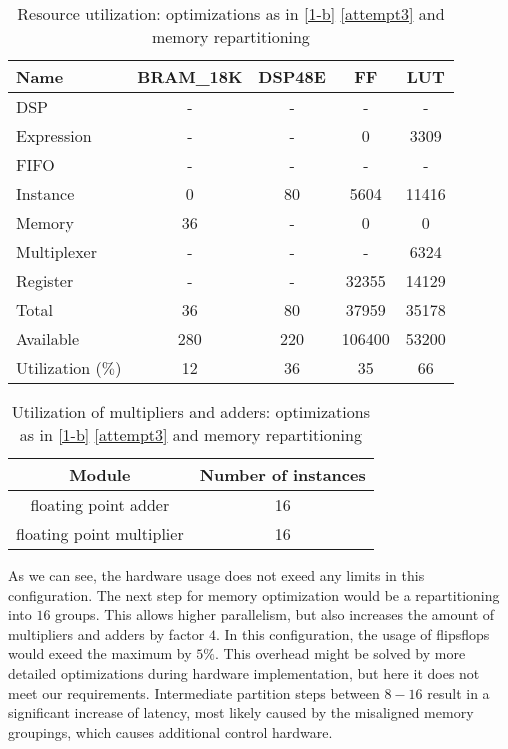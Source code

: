 \documentclass[../main.tex]{subfiles}
\begin{document}
	\begin{table}[H]
		\centering
		\begin{tabular}{lcccc}
			Name      & BRAM\_18K& DSP48E&   FF   &  LUT  \\
			\hline
			DSP              &        -&      -&       -&      -\\
			Expression       &        -&      -&       0&   3309\\
			FIFO             &        -&      -&       -&      -\\
			Instance         &        0&     80&    5604&  11416\\
			Memory           &       36&      -&       0&      0\\
			Multiplexer      &        -&      -&       -&   6324\\
			Register         &        -&      -&   32355&  14129\\
			\hline
			Total            &       36&     80&   37959&  35178\\
			Available        &      280&    220&  106400&  53200\\
			\hline
			Utilization ($\%$)  &       12&     36&      35&     66
		\end{tabular}
		\caption{Resource utilization: optimizations as in \ref{1-b} \ref{attempt3} and memory repartitioning}
		\label{1-c-resources}
	\end{table}

	\begin{table}[H]
		\centering
		\begin{tabular}{cc}
			Module & Number of instances \\
			\hline
			floating point adder & 16 \\
			floating point multiplier & 16
		\end{tabular}
		\caption{Utilization of multipliers and adders: optimizations as in \ref{1-b} \ref{attempt3} and memory repartitioning}
		\label{1-c-resources-arithmetic}
	\end{table}

	As we can see, the hardware usage does not exeed any limits in this configuration. The next step for memory optimization would be a repartitioning into $16$ groups.
	This allows higher parallelism, but also increases the amount of multipliers and adders by factor $4$. In this configuration, the usage of flipsflops would exeed the maximum by $5\%$. This overhead might be solved by more detailed optimizations during hardware implementation, but here it does not meet our requirements.
	Intermediate partition steps between $8-16$ result in a significant increase of latency, most likely caused by the misaligned memory groupings, which causes additional control hardware.
\end{document}
